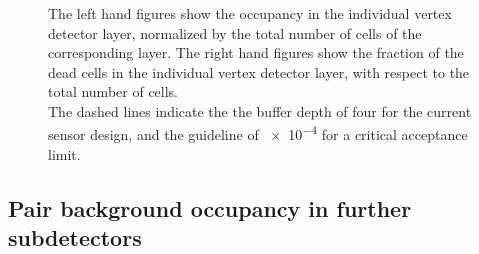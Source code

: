 \begin{figure}[htb]
{   The left hand figures show the occupancy in the individual vertex detector layer, normalized by the total number of cells of the corresponding layer.
   The right hand figures show the fraction of the dead cells in the individual vertex detector layer, with respect to the total number of cells.
   \\The dashed lines indicate the the buffer depth of four for the current sensor design, and the guideline of \num{e-4} for a critical acceptance limit.
   }
 \end{figure}
 
 \clearpage
 \subsection{Pair background occupancy in further \sid subdetectors}

